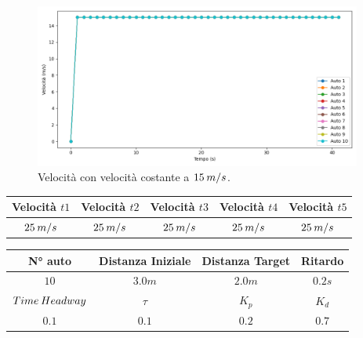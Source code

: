 \begin{figure}[H]
    \includegraphics[width=0.96\textwidth]{images/5-experiment/compost/velocity_a.png}
    \caption{Velocità con velocità costante a $15\hspace{0.2em}m/s$.}
    \label{fig:a-compost-velocity}
\end{figure}

\vspace*{\fill}
\newpage
\vspace*{\fill}
\begin{table}[h]
    \centering
    \begin{tabular}{|c|c|c|c|c|}
        \hline
        Velocità $t1$ & Velocità $t2$ & Velocità $t3$ &Velocità $t4$ &Velocità $t5$\\
        \hline
            $25\hspace{0.2em}m/s$ & $25\hspace{0.2em}m/s$ & $25\hspace{0.2em}m/s$ & $25\hspace{0.2em}m/s$ & $25\hspace{0.2em}m/s$ \\
        \hline
    \end{tabular}
\end{table}
\begin{table}[h]
    \centering
    \begin{tabular}{|c|c|c|c|}
        \hline
        N° auto & Distanza Iniziale & Distanza Target & Ritardo \\
        \hline
        $10$ & $3.0 m$ & $2.0 m$ & $0.2 s$ \\
        \hline
        $Time\hspace{0.2em}Headway$ & $\tau$ & $K_p$ & $K_d$  \\
        \hline
        $0.1$ & $0.1$ & $0.2$ & $0.7$ \\
        \hline
    \end{tabular}
\end{table}

